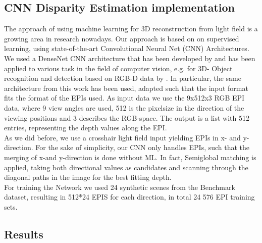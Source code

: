 \documentclass  [
  paper    = a4,
  BCOR     = 10mm,
  twoside,
  fontsize = 12pt,
  fleqn,
  toc      = bibnumbered,
  toc      = listofnumbered,
  numbers  = noendperiod,
  headings = normal,
  listof   = leveldown,
  version  = 3.03
]                                       {scrreprt}
\begin{document}
\begin{appendix}
\chapter{CNN Disparity Estimation implementation}
The approach of using machine learning for 3D reconstruction from light field is a growing area in research nowadays. Our approach is based on on supervised learning, using state-of-the-art Convolutional Neural Net (CNN) Architectures.
We used a DenseNet CNN architecture that has been developed by \cite{huang2017densely} and has been applied to various task in the field of computer vision, e.g. for 3D- Object recognition and detection based on RGB-D data by \cite{wolf2018object}. In particular, the same architecture from this work has been used, adapted such that the input format fits the format of the EPIs used. As input data we use the 9x512x3 RGB EPI data, where 9 view angles are used, 512 is the pixelsize in the direction of the viewing positions and 3 describes the RGB-space. The output is a list with 512 entries, representing the depth values along the EPI. \\
As we did before, we use a crosshair light field input yielding EPIs in x- and y-direction. For the sake of simplicity, our CNN only handles EPIs, such that the merging of x-and y-direction is done without ML. In fact, Semiglobal matching is applied, taking both directional values as candidates and scanning through the diagonal paths in the image for the best fitting depth.\\
For training the Network we used 24 synthetic scenes from the \cite{hci_benchmark} Benchmark dataset, resulting in 512*24 EPIS for each direction, in total 24 576 EPI training sets.

\section*{Results}


\end{appendix}
\end{document}
